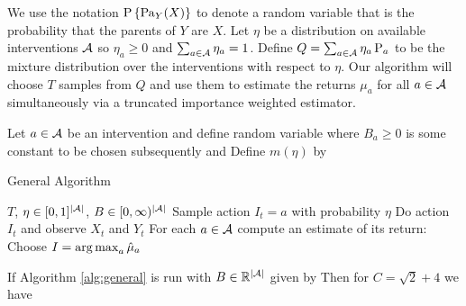 We use the notation $\operatorname{P}\left\{\operatorname{Pa}_{Y}(X)\right\}$ to denote a random variable that is the probability that the parents of $Y$ are $X$.
Let $\eta$ be a distribution on available interventions $\mathcal A$ so $\eta_a \geq 0$ and $\sum_{a \in \mathcal A} \eta_a = 1$.
Define $Q = \sum_{a \in \mathcal A} \eta_a \operatorname{P}_a$ to be the mixture distribution over the interventions with respect to $\eta$.
Our algorithm will choose $T$ samples from $Q$ and use them to estimate the returns $\mu_a$ for all $a \in \mathcal A$ simultaneously via
a truncated importance weighted estimator.

Let $a \in \mathcal A$ be an intervention and define random variable
where $B_a \geq 0$ is some constant to be chosen subsequently and
Define $m(\eta)$ by

\begin{algorithm}[H]
\caption{General Algorithm}\label{alg:general}
\begin{algorithmic}
 $T$, $\eta \in [0,1]^{|\mathcal A|}$, $B \in [0,\infty)^{|\mathcal A|}$
\STATE Sample action $I_t = a$ with probability $\eta$
\STATE Do action $I_t$ and observe $X_t$ and $Y_t$
\ENDFOR
\STATE For each $a \in \mathcal A$ compute an estimate of its return:
\STATE Choose $I = \argmax_a \hat \mu_a$
\end{algorithmic}
\end{algorithm}

\begin{theorem}\label{thm:general}
If Algorithm \ref{alg:general} is run with $B \in \mathbb R^{|\mathcal A|}$ given by
Then for $C = \sqrt{2} + 4$ we have
\end{theorem}

